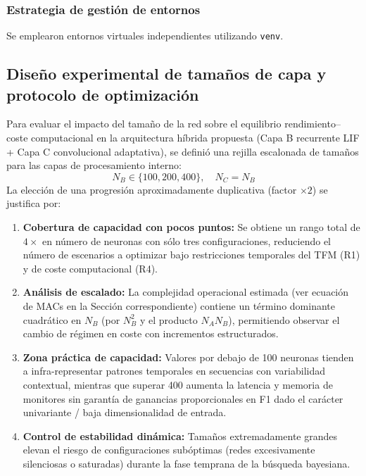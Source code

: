 \subsubsection*{Estrategia de gestión de entornos}
Se emplearon entornos virtuales independientes utilizando \texttt{venv}. 

\subsection{Diseño experimental de tamaños de capa y protocolo de optimización}
\label{subsec:diseno-experimental-neuronas}

Para evaluar el impacto del tamaño de la red sobre el equilibrio rendimiento--coste computacional en la arquitectura híbrida propuesta (Capa B recurrente LIF + Capa C convolucional adaptativa), se definió una rejilla escalonada de tamaños para las capas de procesamiento interno:
\[
N_B \in \{100, 200, 400\}, \quad N_C = N_B
\]
La elección de una progresión aproximadamente duplicativa (factor $\times 2$) se justifica por:

\begin{enumerate}
    \item \textbf{Cobertura de capacidad con pocos puntos:} Se obtiene un rango total de $4\times$ en número de neuronas con sólo tres configuraciones, reduciendo el número de escenarios a optimizar bajo restricciones temporales del TFM (R1) y de coste computacional (R4).
    \item \textbf{Análisis de escalado:} La complejidad operacional estimada (ver ecuación de MACs en la Sección correspondiente) contiene un término dominante cuadrático en $N_B$ (por $N_B^2$ y el producto $N_A N_B$), permitiendo observar el cambio de régimen en coste con incrementos estructurados.
    \item \textbf{Zona práctica de capacidad:} Valores por debajo de 100 neuronas tienden a infra-representar patrones temporales en secuencias con variabilidad contextual, mientras que superar 400 aumenta la latencia y memoria de monitores sin garantía de ganancias proporcionales en F1 dado el carácter univariante / baja dimensionalidad de entrada.
    \item \textbf{Control de estabilidad dinámica:} Tamaños extremadamente grandes elevan el riesgo de configuraciones subóptimas (redes excesivamente silenciosas o saturadas) durante la fase temprana de la búsqueda bayesiana.
\end{enumerate}

